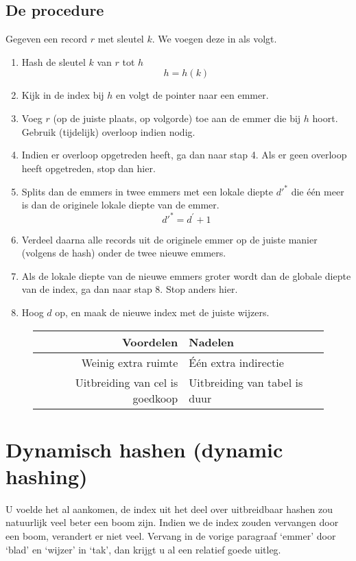 \documentclass[hashing.tex]{subfiles}
\begin{document}
\subsection{De procedure}
Gegeven een record $r$ met sleutel $k$. We voegen deze in als volgt.
\begin{enumerate}
\item Hash de sleutel $k$ van $r$ tot $h$
\[
h = h(k)
\] 
\item Kijk in de index bij $h$ en volgt de pointer naar een emmer.
\item Voeg $r$ (op de juiste plaats, op volgorde) toe aan de emmer die bij $h$ hoort. Gebruik (tijdelijk) overloop indien nodig.
\item Indien er overloop opgetreden heeft, ga dan naar stap 4. Als er geen overloop heeft opgetreden, stop dan hier.
\item Splits dan de emmers in twee emmers met een lokale diepte $d'^{*}$ die \'e\'en meer is dan de originele lokale diepte van de emmer.
\[
d'^{*} = d^{'} + 1
\]
\item Verdeel daarna alle records uit de originele emmer op de juiste manier (volgens de hash) onder de twee nieuwe emmers.
\item Als de lokale diepte van de nieuwe emmers groter wordt dan de globale diepte van de index, ga dan naar stap 8. Stop anders hier.
\item Hoog $d$ op, en maak de nieuwe index met de juiste wijzers.
\end{enumerate}
\begin{figure}[H]
\centering
\begin{tabular}{r|l}
Voordelen & Nadelen\\
\hline
Weinig extra ruimte & \'E\'en extra indirectie\\
Uitbreiding van cel is goedkoop & Uitbreiding van tabel is duur
\end{tabular}
\end{figure}

\section{Dynamisch hashen (dynamic hashing)}
U voelde het al aankomen, de index uit het deel over uitbreidbaar hashen zou natuurlijk veel beter een boom zijn.
Indien we de index zouden vervangen door een boom, verandert er niet veel. Vervang in de vorige paragraaf `emmer' door `blad' en `wijzer' in `tak', dan krijgt u al een relatief goede uitleg.
\end{document}
